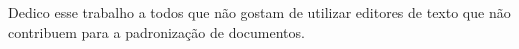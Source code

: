 Dedico esse trabalho a todos que não gostam de utilizar editores de texto que não contribuem para a padronização de documentos.